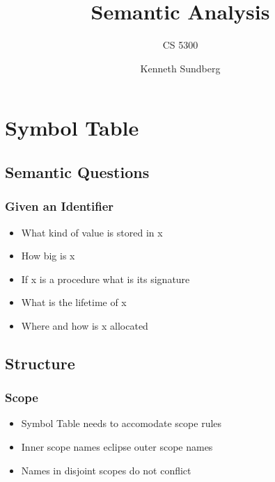 \documentclass[usepdftitle=false,professionalfonts,compress ]{beamer}
\title{Semantic Analysis}
\subtitle{CS 5300}
\author{Kenneth Sundberg}
\date{}
\begin{document}
\frame[plain]{
	\frametitle{}
	\titlepage
	\vspace{-0.5cm}
	\begin{center}
	\end{center}
}
\frame{
	\tableofcontents[hideallsubsections]
}
















\section{Symbol Table}
		
\subsection{Semantic Questions}

{
\begin{frame}\frametitle{Given an Identifier}

	\begin{itemize}
	\item What kind of value is stored in x
			\item How big is x
			\item If x is a procedure what is its signature
			\item What is the lifetime of x
			\item Where and how is x allocated
				\end{itemize}

\end{frame}}







\subsection{Structure}

{
\begin{frame}\frametitle{Scope}

	\begin{itemize}
	\item Symbol Table needs to accomodate scope rules
			\item Inner scope names eclipse outer scope names
			\item Names in disjoint scopes do not conflict
				\end{itemize}

\end{frame}}
\end{document}
